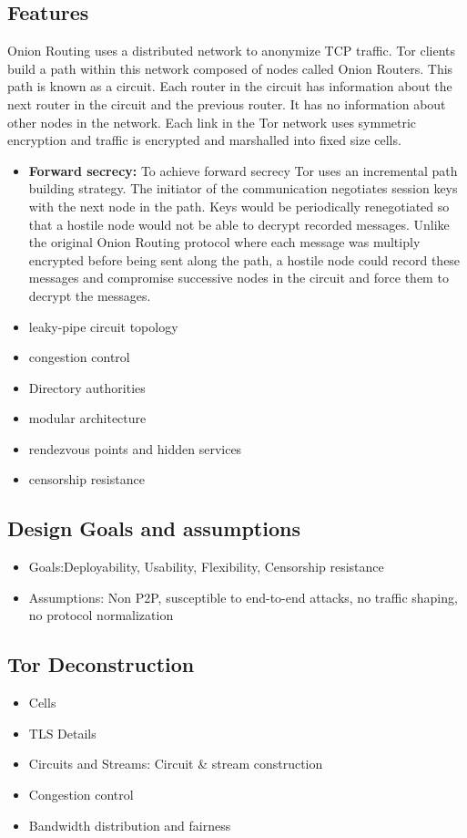 \documentclass{llncs}
\begin{document}
\subsection{Features}
Onion Routing uses a distributed network to anonymize TCP traffic. Tor clients build a path within this network composed of nodes called Onion Routers. This path is known as a circuit. Each router in the circuit has information about the next router in the circuit and the previous router. It has no information about other nodes in the network. Each link in the Tor network uses symmetric encryption and traffic is encrypted and marshalled into fixed size cells. 
\begin{itemize}
	\item[]{\textbf{Forward secrecy:} To achieve forward secrecy Tor uses an incremental path building strategy. The initiator of the communication negotiates session keys with the next node in the path. Keys would be periodically renegotiated so that a hostile node would not be able to decrypt recorded messages. Unlike the original Onion Routing protocol where each message was multiply encrypted before being sent along the path, a hostile node could record these messages and compromise successive nodes in the circuit and force them to decrypt the messages.}
	\item{leaky-pipe circuit topology}
	\item{congestion control}
	\item{Directory authorities}
	\item{modular architecture}
	\item{rendezvous points and hidden services}
	\item{censorship resistance}
\end{itemize}
\subsection{Design Goals and assumptions}
\begin{itemize}
	\item{Goals:Deployability, Usability, Flexibility, Censorship resistance}
	\item{Assumptions: Non P2P, susceptible to end-to-end attacks, no traffic shaping, no protocol normalization}
\end{itemize}
\subsection{Tor Deconstruction}
\begin{itemize}
	\item{Cells}
	\item{TLS Details}
	\item{Circuits and Streams: Circuit \& stream construction}
	\item{Congestion control}
	\item{Bandwidth distribution and fairness}
\end{itemize}
\end{document}
